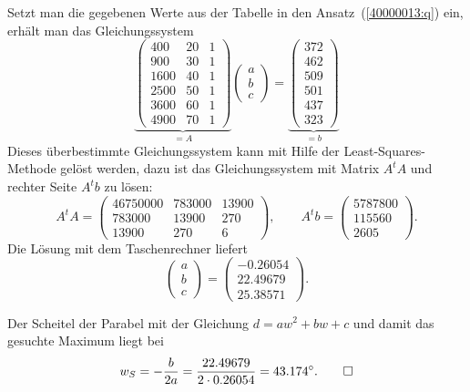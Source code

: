 \begin{loesung}
\begin{teilaufgaben}
\item
Setzt man die gegebenen Werte aus der Tabelle in den Ansatz~(\ref{40000013:q})
ein, erhält man das Gleichungssystem
\[
\underbrace{
\begin{pmatrix}
 400&20&1\\
 900&30&1\\
1600&40&1\\
2500&50&1\\
3600&60&1\\
4900&70&1
\end{pmatrix}}_{\displaystyle = A}
\begin{pmatrix}
a\\
b\\
c
\end{pmatrix}
=
\underbrace{
\begin{pmatrix}
372\\
462\\
509\\
501\\
437\\
323
\end{pmatrix}}_{\displaystyle = b}
\]
Dieses überbestimmte Gleichungssystem kann mit Hilfe der
Least-Squares-Methode gelöst werden, dazu ist das Gleichungssystem
mit Matrix $A^tA$ und rechter Seite $A^tb$ zu lösen:
\[
A^tA
=
\begin{pmatrix}
46750000&783000&13900\\
  783000& 13900&  270\\
   13900&   270&    6
\end{pmatrix},
\qquad
A^tb
=
\begin{pmatrix}
5787800\\
 115560\\
   2605
\end{pmatrix}.
\]
Die Lösung mit dem Taschenrechner liefert
\[
\begin{pmatrix}
a\\b\\c
\end{pmatrix}
=
\begin{pmatrix}
-0.26054\\
22.49679\\
25.38571
\end{pmatrix}.
\]
\item
Der Scheitel der Parabel mit der Gleichung $d=aw^2 + bw+c$
und damit das gesuchte Maximum liegt bei
\[
w_S=-\frac{b}{2a}=\frac{22.49679}{2\cdot 0.26054}=43.174^\circ.
\qedhere
\]
\end{teilaufgaben}
\end{loesung}

